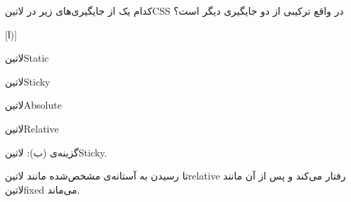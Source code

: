 
کدام یک از جایگیری‌های زیر در ‌لاتین{CSS} در واقع ترکیبی از دو جایگیری دیگر است؟

[ا)]

 ‌لاتین{Static}

 ‌لاتین{Sticky}

 ‌لاتین{Absolute}

 ‌لاتین{Relative}




\begin{پاسخ}

گزینه‌ی (ب): ‌لاتین{Sticky}.

تا رسیدن به آستانه‌ی مشخص‌شده مانند ‌لاتین{relative} رفتار می‌کند و پس از آن مانند ‌لاتین{fixed} می‌ماند.

\end{پاسخ}
